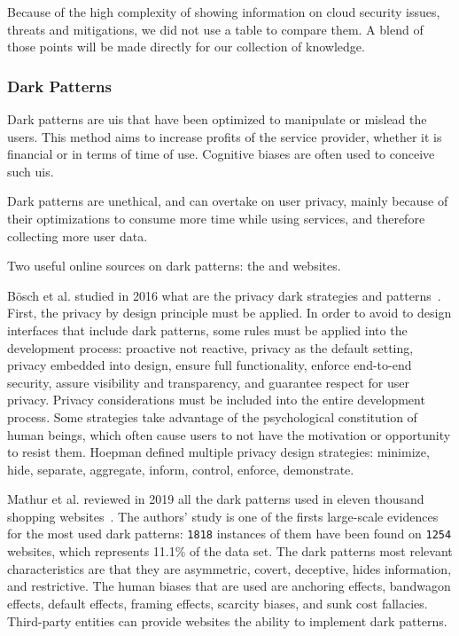 Because of the high complexity of showing information on \gls{cloud} security issues, threats and mitigations, we did not use a table to compare them. A blend of those points will be made directly for our collection of knowledge.

\subsubsection{Dark Patterns}
\label{subsubsec:state_review_results_darkpatterns}

Dark patterns are \glspl{ui} that have been optimized to manipulate or mislead the users. This method aims to increase profits of the service provider, whether it is financial or in terms of time of use. Cognitive biases are often used to conceive such \glspl{ui}.

Dark patterns are unethical, and can overtake on user privacy, mainly because of their optimizations to consume more time while using services, and therefore collecting more user data.

Two useful online sources on dark patterns: the  and   websites.

Bösch et al. studied in 2016 what are the privacy dark strategies and patterns~\cite{bosch_tales_2016}. First, the privacy by design principle must be applied. In order to avoid to design interfaces that include dark patterns, some rules must be applied into the development process: proactive not reactive, privacy as the default setting, privacy embedded into design, ensure full functionality, enforce end-to-end security, assure visibility and transparency, and guarantee respect for user privacy. Privacy considerations must be included into the entire development process. Some strategies take advantage of the psychological constitution of human beings, which often cause users to not have the motivation or opportunity to resist them. Hoepman defined multiple privacy design strategies: minimize, hide, separate, aggregate, inform, control, enforce, demonstrate.  %

Mathur et al. reviewed in 2019 all the dark patterns used in eleven thousand shopping websites~\cite{mathur_dark_2019}. The authors' study is one of the firsts large-scale evidences for the most used dark patterns: \texttt{1818} instances of them have been found on \texttt{1254} websites, which represents 11.1\% of the data set. The dark patterns most relevant characteristics are that they are asymmetric, covert, deceptive, hides information, and restrictive. The human biases that are used are anchoring effects, bandwagon effects, default effects, framing effects, scarcity biases, and sunk cost fallacies. Third-party entities can provide websites the ability to implement dark patterns. %

